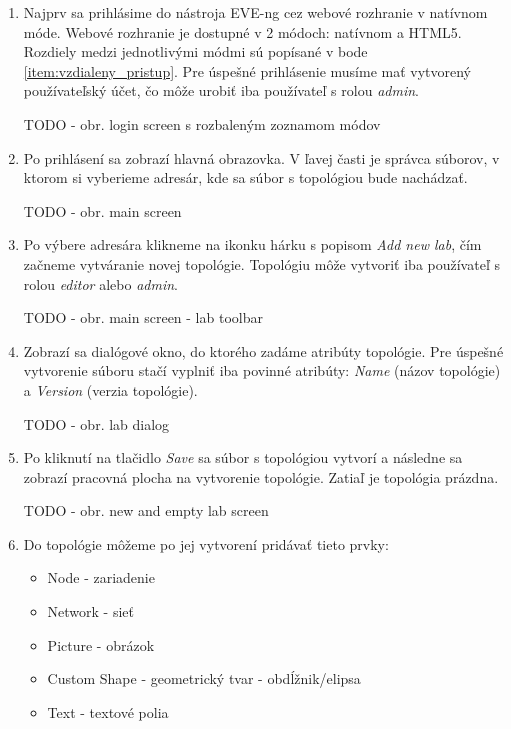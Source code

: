 \begin{enumerate}[noitemsep]

    \item \label{item:prihlasenie} Najprv sa prihlásime do nástroja EVE-ng cez webové rozhranie v natívnom móde. Webové rozhranie je dostupné v 2 módoch: natívnom a HTML5. Rozdiely medzi jednotlivými módmi sú popísané v bode \ref{item:vzdialeny_pristup}. Pre úspešné prihlásenie musíme mať vytvorený používateľský účet, čo môže urobiť iba používateľ s rolou \emph{admin}.

{\huge TODO - obr. login screen s rozbaleným zoznamom módov}

    \item Po prihlásení sa zobrazí hlavná obrazovka. V ľavej časti je správca súborov, v ktorom si vyberieme adresár, kde sa súbor s topológiou bude nachádzať.

{\huge TODO - obr. main screen}

    \item Po výbere adresára klikneme na ikonku hárku s popisom \emph{Add new lab}, čím začneme vytváranie novej topológie. Topológiu môže vytvoriť iba používateľ s rolou \emph{editor} alebo \emph{admin}.

{\huge TODO - obr. main screen - lab toolbar}

    \item Zobrazí sa dialógové okno, do ktorého zadáme atribúty topológie. Pre úspešné vytvorenie súboru stačí vyplniť iba povinné atribúty: \emph{Name} (názov topológie) a \emph{Version} (verzia topológie).
    
{\huge TODO - obr. lab dialog}

    \item Po kliknutí na tlačidlo \emph{Save} sa súbor s topológiou vytvorí a následne sa zobrazí pracovná plocha na vytvorenie topológie. Zatiaľ je topológia prázdna.
    
{\huge TODO - obr. new and empty lab screen}

    \item Do topológie môžeme po jej vytvorení pridávať tieto prvky:
    
    \begin{itemize}[noitemsep]
        \item Node - zariadenie
        \item Network - sieť
        \item Picture - obrázok
        \item Custom Shape - geometrický tvar - obdĺžnik/elipsa
        \item Text - textové polia
    \end{itemize}
    

\end{enumerate}
